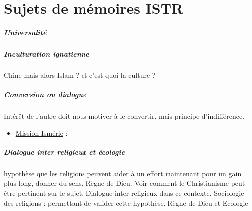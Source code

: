 \chapter{Sujets de mémoires ISTR}

\paragraph{Universalité}

\paragraph{Inculturation ignatienne} Chine mais alors Islam ? et c'est quoi la culture ?

\paragraph{Conversion ou dialogue} Intérêt de l'autre doit nous motiver à le convertir. mais principe d'indifférence. 
\begin{itemize}
    \item \href{https://mission-ismerie.com/}{Mission Ismérie}  : 
\end{itemize}

\paragraph{Dialogue inter religieux et écologie} hypothèse que les religions peuvent aider à un effort maintenant pour un gain plus long, donner du sens, Règne de Dieu. Voir comment le Christianisme peut être pertinent sur le sujet.
Dialogue inter-religieux dans ce contexte. Sociologie des religions : permettant de valider cette hypothèse.
Règne de Dieu et Ecologie

